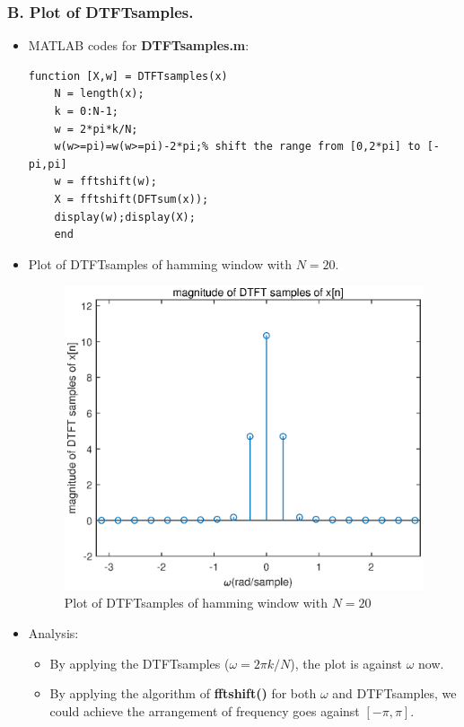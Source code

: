 \documentclass[onecolumn,oneside]{SUSTechHomework}
\begin{document}
\subsubsection*{B. Plot of DTFTsamples.}
\begin{itemize}
	\item MATLAB codes for \textbf{DTFTsamples.m}:
\begin{lstlisting}[title=\textbf{DTFTsamples.m}]
	function [X,w] = DTFTsamples(x)
	N = length(x);
	k = 0:N-1;
	w = 2*pi*k/N;
	w(w>=pi)=w(w>=pi)-2*pi;% shift the range from [0,2*pi] to [-pi,pi]
	w = fftshift(w);
	X = fftshift(DFTsum(x));
	display(w);display(X);
	end 
\end{lstlisting}
	\item Plot of DTFTsamples of hamming window with $N=20$.
\begin{figure}[H]
	\centering
	\includegraphics[width=150mm]{pictures/fig2.eps}
	\caption{Plot of DTFTsamples of hamming window with $N=20$}
\end{figure}
	\item Analysis: 
	\begin{itemize}
		\item By applying the DTFTsamples ($\omega=2\pi k/N$), the plot is against $\omega$ now.
		\item By applying the algorithm of \textbf{fftshift()} for both $\omega$ and DTFTsamples,
		we could achieve the arrangement of frequency goes against $[-\pi,\pi]$.
	\end{itemize}
\end{itemize}
\end{document}
